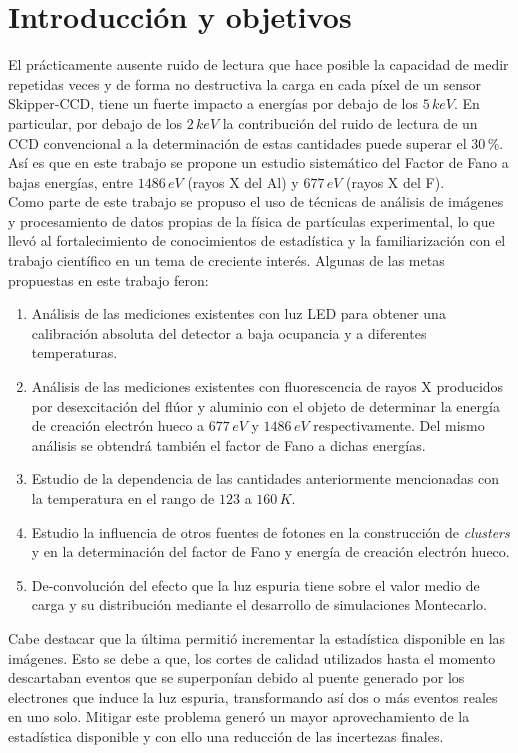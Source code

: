 
\chapter{Introducción y objetivos}
\noindent El prácticamente ausente ruido de lectura que hace posible la capacidad de medir repetidas veces y de forma no destructiva la carga en cada píxel de un sensor Skipper-CCD, tiene un fuerte impacto a energías por debajo de los $5\,keV$. En particular, por debajo de los $2\,keV$ la contribución del ruido de lectura de un CCD convencional a la determinación de estas cantidades puede superar el $30\,\%$. Así es que en este trabajo se propone un estudio sistemático del Factor de Fano a bajas energías, entre $1486\,eV$ (rayos X del Al) y $677\,eV$ (rayos X del F).\\
\indent Como parte de este trabajo se propuso el uso de técnicas de análisis de imágenes y procesamiento de datos propias de la física de partículas experimental, lo que llevó al fortalecimiento de conocimientos de estadística y la familiarización con el trabajo científico en un tema de creciente interés. 
Algunas de las metas propuestas en este trabajo feron:
\begin{enumerate}
    \item Análisis de las mediciones existentes con luz LED para obtener una calibración absoluta del detector a baja ocupancia y a diferentes temperaturas.
    \item Análisis de las mediciones existentes con fluorescencia de rayos X producidos por desexcitación del flúor y aluminio con el objeto de determinar la energía de creación electrón hueco a $677\,eV$ y $1486\,eV$ respectivamente. Del mismo análisis se obtendrá también el factor de Fano a dichas energías.
    \item Estudio de la dependencia de las cantidades anteriormente mencionadas con la temperatura en el rango de $123$ a $160\,K$.
    \item Estudio la influencia de otros fuentes de fotones en la construcción de \textit{clusters} y en la determinación del factor de Fano y energía de creación electrón hueco.
    \item De-convolución del efecto que la luz espuria tiene sobre el valor medio de carga y su distribución mediante el desarrollo de simulaciones Montecarlo.
\end{enumerate}
Cabe destacar que la última permitió incrementar la estadística disponible en las imágenes. Esto se debe a que, los cortes de calidad utilizados hasta el momento descartaban eventos que se superponían debido al puente generado por los electrones que induce la luz espuria, transformando así dos o más eventos reales en uno solo. Mitigar este problema generó un mayor aprovechamiento de la estadística disponible y con ello una reducción de las incertezas finales.

